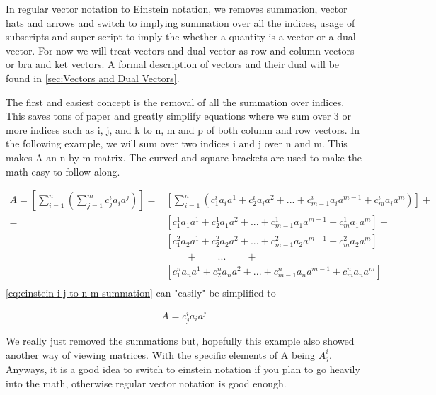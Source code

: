 \documentclass[11pt,a4paper]{book}
\begin{document}
		In regular vector notation to Einstein notation, we removes summation, vector hats and arrows and switch to implying summation over all the indices, usage of subscripts and super script to imply the whether a quantity is a vector or a dual vector. For now we will treat vectors and dual vector as row and column vectors or bra and ket vectors. A formal description of vectors and their dual will be found in \autoref{sec:Vectors and Dual Vectors}.
		
		The first and easiest concept is the removal of all the summation over indices. This saves tons of paper and greatly simplify equations where we sum over 3 or more indices such as i, j, and k to n, m and p of both column and row vectors. In the following example, we will sum over two indices i and j over n and m. This makes A an n by m matrix. The curved and square brackets are used to make the math easy to follow along.
		
		\begin{equation}
			\begin{split}
				\label{eq:einstein i j to n m summation}
				A = \left[ \sum_{i=1}^{n} \left( \sum_{j=1}^{m} c_j^i a_i a^j \right) \right] 
				 = &
				\left[\sum_{i=1}^{n} 
					\left( 
						c_1^i a_i a^1 + c_2^i a_i a^2 +...+ c_{m-1}^i a_i a^{m-1} +c_m^i a_i a^m 
					\right) 
				\right] + \\
				 = &\left[ c_1^1 a_1 a^1 + c_2^1 a_1 a^2 +...+c_{m-1}^1 a_1 a^{m-1}+c_m^1 a_1 a^m \right] + \\
				& \left[ c_1^2 a_2 a^1 + c_2^2 a_2 a^2 +...+c_{m-1}^2 a_2 a^{m-1}+c_m^2 a_2 a^m  \right] \\
				& \qquad + \qquad ... \qquad+ \\
				& \left[ c_1^n a_n a^1 + c_2^n a_n a^2 +...+c_{m-1}^n a_n a^{m-1}+c_m^n a_n a^m  \right] \\
			\end{split}
		\end{equation}
		\autoref{eq:einstein i j to n m summation} can "easily" be simplified to 
		
		\begin{equation}
			\label{eq:einstein i j to n m no summation}
			A=c_j^i a_i a^j
		\end{equation}
		
		\noindent
		We really just removed the summations but, hopefully this example also showed another way of viewing matrices. With the specific elements of A being $A^i_j$. Anyways, it is a good idea to switch to einstein notation if you plan to go heavily into the math, otherwise regular vector notation is good enough.
\end{document}
